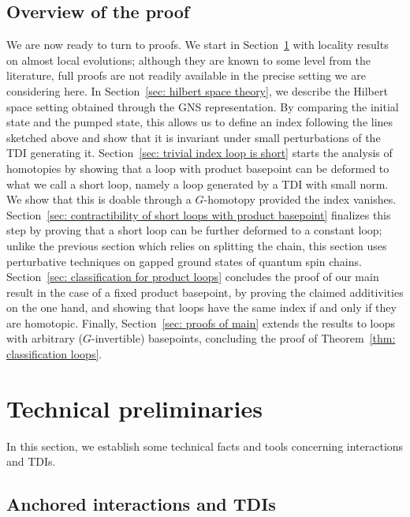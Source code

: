 \subsection{Overview of the proof}\label{sec:plan}
We are now ready to turn to proofs. We start in Section~\ref{sec: technical preliminaries} with locality results on almost local evolutions; although they are known to some level from the literature, full proofs are not readily available in the precise setting we are considering here. In Section~\ref{sec: hilbert space theory}, we describe the Hilbert space setting obtained through the GNS representation. By comparing the initial state and the pumped state, this allows us to define an index following the lines sketched above and show that it is invariant under small perturbations of the TDI generating it. Section~\ref{sec: trivial index loop is short} starts the analysis of homotopies by showing that a loop with product basepoint can be deformed to what we call a short loop, namely a loop generated by a TDI with small norm. We show that this is doable through a $G$-homotopy provided the index vanishes. Section~\ref{sec: contractibility of short loops with product basepoint} finalizes this step by proving that a short loop can be further deformed to a constant loop; unlike the previous section which relies on splitting the chain, this section uses perturbative techniques on gapped ground states of quantum spin chains. Section~\ref{sec: classification for product loops} concludes the proof of our main result in the case of a fixed product basepoint, by proving the claimed additivities on the one hand, and showing that loops have the same index if and only if they are homotopic. Finally, Section~\ref{sec: proofs of main} extends the results to loops with arbitrary ($G$-invertible) basepoints, concluding the proof of Theorem~\ref{thm: classification loops}.


\section{Technical preliminaries}   \label{sec: technical preliminaries}
In this section, we establish some technical facts and tools concerning interactions and TDIs.  


\subsection{Anchored interactions and TDIs} \label{sec: anchored interactions}

